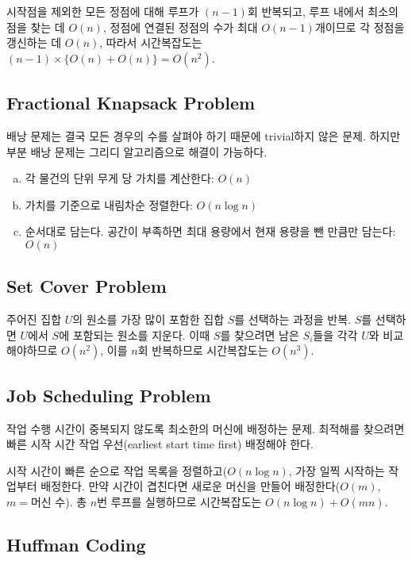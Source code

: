 시작점을 제외한 모든 정점에 대해 루프가 $(n - 1)$회 반복되고, 루프 내에서 최소의 점을 찾는 데 $O(n)$, 정점에 연결된 정점의 수가 최대 $O(n - 1)$개이므로 각 정점을 갱신하는 데 $O(n)$, 따라서 시간복잡도는 $(n - 1) \times \{O(n) + O(n)\} = O(n^2)$.

\subsection{Fractional Knapsack Problem}

배낭 문제는 결국 모든 경우의 수를 살펴야 하기 때문에 trivial하지 않은 문제. 하지만 부분 배낭 문제는 그리디 알고리즘으로 해결이 가능하다.

\begin{enumerate}[(a)]
  \item 각 물건의 단위 무게 당 가치를 계산한다: $O(n)$
  \item 가치를 기준으로 내림차순 정렬한다: $O(n \log{n})$
  \item 순서대로 담는다. 공간이 부족하면 최대 용량에서 현재 용량을 뺀 만큼만 담는다: $O(n)$
\end{enumerate}

\subsection{Set Cover Problem}

주어진 집합 $U$의 원소를 가장 많이 포함한 집합 $S$를 선택하는 과정을 반복. $S$를 선택하면 $U$에서 $S$에 포함되는 원소를 지운다. 이때 $S$를 찾으려면 남은 $S_i$들을 각각 $U$와 비교해야하므로 $O(n^2)$, 이를 $n$회 반복하므로 시간복잡도는 $O(n^3)$.

\subsection{Job Scheduling Problem}

작업 수행 시간이 중복되지 않도록 최소한의 머신에 배정하는 문제. 최적해를 찾으려면 빠른 시작 시간 작업 우선(earliest start time first) 배정해야 한다.

시작 시간이 빠른 순으로 작업 목록을 정렬하고($O(n \log{n})$, 가장 일찍 시작하는 작업부터 배정한다. 만약 시간이 겹친다면 새로운 머신을 만들어 배정한다($O(m)$, $m = \text{머신 수}$). 총 $n$번 루프를 실행하므로 시간복잡도는 $O(n \log{n}) + O(mn)$.

\subsection{Huffman Coding}

